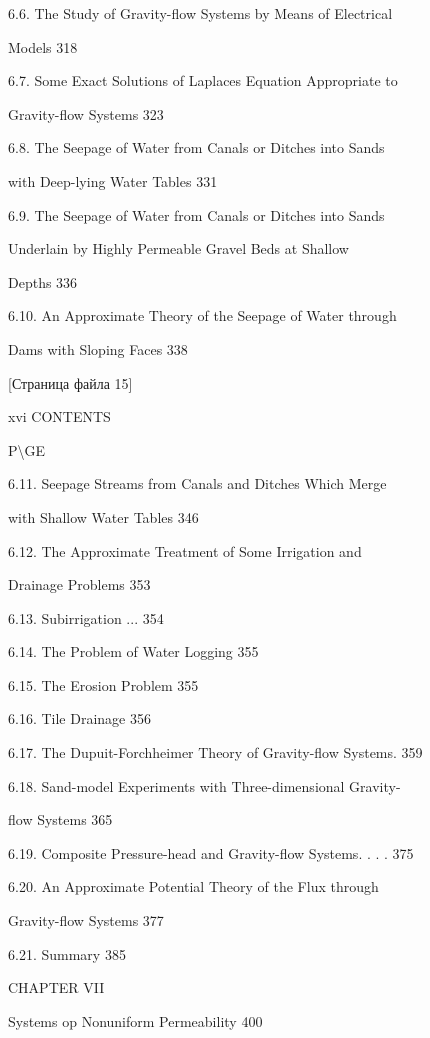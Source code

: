 \documentclass[
  11pt,
]{article}
\begin{document}
6.6. The Study of Gravity-flow Systems by Means of Electrical \par
Models 318 \par
6.7. Some Exact Solutions of Laplace\textquotesingle s Equation Appropriate to \par
Gravity-flow Systems 323 \par
6.8. The Seepage of Water from Canals or Ditches into Sands \par
with Deep-lying Water Tables 331 \par
6.9. The Seepage of Water from Canals or Ditches into Sands \par
Underlain by Highly Permeable Gravel Beds at Shallow \par
Depths 336 \par
6.10. An Approximate Theory of the Seepage of Water through \par
Dams with Sloping Faces 338 \par
\smallskip
\smallskip
\smallskip
{[}Страница файла 15{]}\par
xvi CONTENTS \par
P\textbackslash GE \par
6.11. Seepage Streams from Canals and Ditches Which Merge \par
with Shallow Water Tables 346 \par
6.12. The Approximate Treatment of Some Irrigation and  \par
Drainage Problems 353 \par
6.13. Subirrigation ... 354 \par
6.14. The Problem of Water Logging 355 \par
6.15. The Erosion Problem 355 \par
6.16. Tile Drainage 356 \par
6.17. The Dupuit-Forchheimer Theory of Gravity-flow Systems. 359 \par
6.18. Sand-model Experiments with Three-dimensional Gravity- \par
flow Systems 365 \par
6.19. Composite Pressure-head and Gravity-flow Systems. . . . 375 \par
6.20. An Approximate Potential Theory of the Flux through \par
Gravity-flow Systems 377 \par
6.21. Summary 385 \par
CHAPTER VII \par
Systems op Nonuniform Permeability 400 \par
\end{document}
